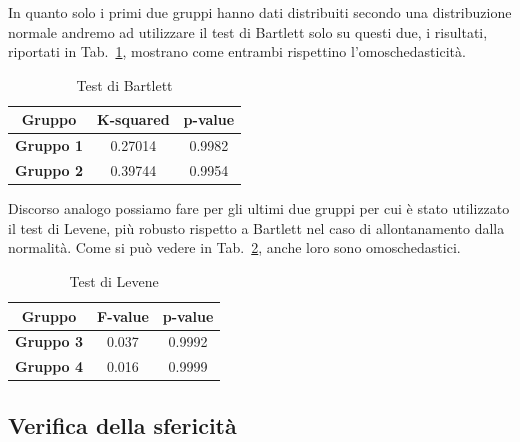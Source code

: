 \documentclass[conference]{IEEEtran}
\begin{document}
In quanto solo i primi due gruppi hanno dati distribuiti secondo una distribuzione normale
andremo ad utilizzare il test di Bartlett solo su questi due, i risultati,
riportati in Tab.~\ref{tab2}, mostrano come entrambi rispettino l'omoschedasticità.
\begin{table}[htbp]
    \caption{Test di Bartlett}
    \begin{center}
    \begin{tabular}{|c|c|c|}
    \hline
    \textbf{Gruppo} & \textbf{K-squared} & \textbf{p-value} \\
    \hline
    \textbf{Gruppo 1} & 0.27014 & 0.9982 \\\cline{1-3}
    \textbf{Gruppo 2} & 0.39744 & 0.9954 \\\cline{1-3}
    \hline
    \end{tabular}
    \label{tab2}
    \end{center}
\end{table}

Discorso analogo possiamo fare per gli ultimi due gruppi per cui è stato utilizzato il test di
Levene, più robusto rispetto a Bartlett nel caso di allontanamento dalla normalità.
Come si può vedere in Tab.~\ref{tab3}, anche loro sono omoschedastici.
\begin{table}[htbp]
    \caption{Test di Levene}
    \begin{center}
    \begin{tabular}{|c|c|c|}
    \hline
    \textbf{Gruppo} & \textbf{F-value} & \textbf{p-value} \\
    \hline
    \textbf{Gruppo 3} & 0.037 & 0.9992 \\\cline{1-3}
    \textbf{Gruppo 4} & 0.016 & 0.9999 \\\cline{1-3}
    \hline
    \end{tabular}
    \label{tab3}
    \end{center}
\end{table}

\subsection{Verifica della sfericità}
\end{document}
